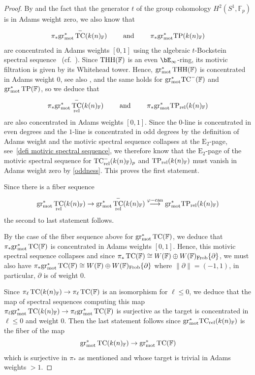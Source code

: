 \documentclass[english,10pt]{amsart}
\newcommand{\rel}{\textup{rel}}
\newcommand{\field}{\mathbb{F}}
\theoremstyle{definition}
\numberwithin{equation}{section}
\DeclareMathOperator{\TC}{TC}
\newcommand{\ntc}{\mathrm{TC}^{-}}
\DeclareMathOperator{\tp}{\ensuremath{\textup{TP}}}
\DeclareMathOperator{\tc}{\ensuremath{\textup{TC}}}
\DeclareMathOperator{\thh}{\ensuremath{\textup{THH}}}
\newcommand{\rtc}{\mathrm{TC}_{\rel}}
\newcommand{\TP}{\mathrm{TP}}
\newcommand{\grmot}{\mathrm{gr}_{\textup{mot}}^*}
\newcommand{\pis}{\pi_*}
\begin{document}
\begin{proof}
By \cite[Corollary~2.2.11]{angelini2024syntomic} and the fact that the generator $t$ of the group cohomology $H^2(S^1,\mathbb{F}_p)$  is in Adams weight zero, we also know that 
\[ 
\pi_*\grmot\TC^{-}(k(n)_{\field}) \qquad \text{ and } \qquad \pi_*\grmot\TP(k(n)_{\field})
\]
are concentrated in Adams weights $[0,1]$ using the algebraic $t$-Bockstein spectral sequence~\cite[Construction~2.1.14]{hahn2022motivic} (cf.~\cite[\S 3]{AKAR23}). 
Since $\thh(\field)$ is an even $\bE_\infty$-ring, its motivic filtration is given by its Whitehead tower. Hence,  $\grmot\thh(\field)$ is concentrated in Adams weight $0$, see also \cite[Proposition 2.2.8]{angelini2024syntomic}, and the same holds for $\grmot \ntc(\field)$ and $\grmot \tp(\field)$, so we deduce that 
\[
\pi_*\grmot\TC^{-}_{\textup{rel}}(k(n)_{\field}) \qquad \text{ and } \qquad \pi_*\grmot\TP_{\textup{rel}}(k(n)_{\field})
\]
are also concentrated in Adams weights $[0,1]$. Since the $0$-line is concentrated in even degrees and the $1$-line is concentrated in odd degrees  by the definition of Adams weight and the motivic spectral sequence collapses at the $\mathrm{E}_2$-page, see~\autoref{defi motivic spectral sequence}, we therefore know that the $\mathrm{E}_2$-page of the motivic spectral sequence for $\TC^{-}_{\textup{rel}}(k(n)_{\field})_p$ and $\TP_{\textup{rel}}(k(n)_{\field})$ must vanish in Adams weight zero by \autoref{oddness}. This proves the first statement. 

Since there is a fiber sequence 
\[ \grmot\TC_{\textup{rel}}(k(n)_{\field})\to \grmot\TC^{-}_{\textup{rel}}(k(n)_{\field})\overset{\varphi-\mathrm{can}}{\longrightarrow} \grmot\TP_{\textup{rel}}(k(n)_{\field})\]
the second to last statement follows.

By the case of the fiber sequence above for $\grmot \tc(\field)$, we deduce that  $\pis \grmot \tc(\field)$ is concentrated in Adams weights $[0,1]$. Hence, this motivic spectral sequence collapses and since $\pis \tc(\field) \cong W(\field) \oplus W(\field)_{\mathrm{Frob}}\{\partial\}$, we must also have $\pis \grmot \tc(\field) \cong W(\field) \oplus W(\field)_\mathrm{Frob}\{\partial\}$ where $\|\partial \| = (-1,1)$, in particular, $\partial$ is of weight $0$. 

 Since $\pi_\ell \tc(k(n)_\field) \to \pi_\ell \tc(\field)$ is an isomorphism for $\ell \leq 0$, we deduce that the map of  spectral sequences computing this map $\pi_\ell \grmot \tc(k(n)_\field) \to \pi_\ell \grmot \tc(\field)$ is surjective as the target is concentrated in $\ell\leq 0$ and  weight $0$. Then the last statement follows since $\grmot \rtc(k(n)_{\field})$ is the fiber of the map 
\[ \grmot\TC(k(n)_{\field})\to \grmot\TC(\field)
\]
which is surjective in $\pis$ as mentioned and whose target is trivial in Adams weights $>1$.
\end{proof}
\end{document}
